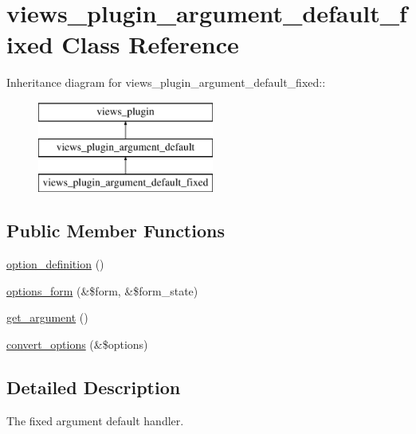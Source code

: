 \hypertarget{classviews__plugin__argument__default__fixed}{
\section{views\_\-plugin\_\-argument\_\-default\_\-fixed Class Reference}
\label{classviews__plugin__argument__default__fixed}
}
Inheritance diagram for views\_\-plugin\_\-argument\_\-default\_\-fixed::\begin{figure}[H]
\begin{center}
\leavevmode
\includegraphics[height=3cm]{classviews__plugin__argument__default__fixed}
\end{center}
\end{figure}
\subsection*{Public Member Functions}
\begin{DoxyCompactItemize}
\item 
\hyperlink{classviews__plugin__argument__default__fixed_a6a0c87651155c020fc3b00c049db3add}{option\_\-definition} ()
\item 
\hyperlink{classviews__plugin__argument__default__fixed_a77c335bd34999e6e241193dbc25f6a8c}{options\_\-form} (\&\$form, \&\$form\_\-state)
\item 
\hyperlink{classviews__plugin__argument__default__fixed_a4790728e6d3cae3a3a6fa5f63357a1fb}{get\_\-argument} ()
\item 
\hyperlink{classviews__plugin__argument__default__fixed_a69ba4df78a331a961cc021e3b1f662b7}{convert\_\-options} (\&\$options)
\end{DoxyCompactItemize}


\subsection{Detailed Description}
The fixed argument default handler. 

